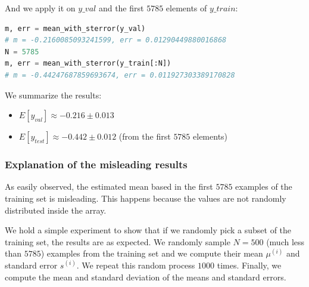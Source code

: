 \documentclass{article}
\begin{document}







And we apply it on $y\_val$ and the first $5785$ elements of $y\_train$:

\begin{lstlisting}[language=Python]
m, err = mean_with_sterror(y_val)
# m = -0.2160085093241599, err = 0.01290449880016868
N = 5785
m, err = mean_with_sterror(y_train[:N])
# m = -0.44247687859693674, err = 0.011927303389170828
\end{lstlisting}


We summarize the results:
\begin{itemize}
    \item $E[y_{val}] \approx - 0.216 \pm 0.013$
    \item $E[y_{test}] \approx - 0.442 \pm 0.012$ (from the first $5785$ elements)
\end{itemize}

\subsubsection*{Explanation of the misleading results}

As easily observed, the estimated mean based in the first $5785$ examples of the training set is misleading. This happens because the values are not randomly distributed inside the array.

We hold a simple experiment to show that if we randomly pick a subset of the training set, the results are as expected. We randomly sample $N = 500$ (much less than $5785$) examples from the training set and we compute their mean $\mu^{(i)}$ and standard error $s^{(i)}$. We repeat this random process $1000$ times. Finally, we compute the mean and standard deviation of the means and standard errors. 
\end{document}
